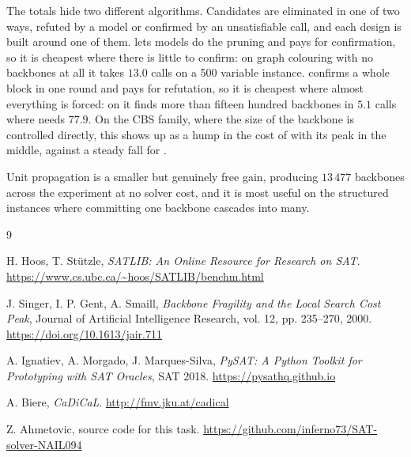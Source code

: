 \documentclass[11pt,a4paper]{article}
\begin{document}
The totals hide two different algorithms.
Candidates are eliminated in one of two ways, refuted by a model or confirmed
by an unsatisfiable call, and each design is built around one of them.
 lets models do the pruning and pays for confirmation, so it
is cheapest where there is little to confirm: on graph colouring with no
backbones at all it takes $13.0$ calls on a 500 variable instance.
 confirms a whole block in one round and pays for refutation,
so it is cheapest where almost everything is forced: on  it
finds more than fifteen hundred backbones in $5.1$ calls where
 needs $77.9$. On the CBS family, where the size of the
backbone is controlled directly, this shows up as a hump in the cost of
 with its peak in the middle, against a steady fall for
.

Unit propagation is a smaller but genuinely free gain, producing $13\,477$
backbones across the experiment at no solver cost, and it is most useful on
the structured instances where committing one backbone cascades into many.

\clearpage

\begin{thebibliography}{9}

H. Hoos, T. St\"utzle, \emph{SATLIB: An Online Resource for Research on SAT}.
\url{https://www.cs.ubc.ca/~hoos/SATLIB/benchm.html}

J. Singer, I. P. Gent, A. Smaill, \emph{Backbone Fragility and the Local
Search Cost Peak}, Journal of Artificial Intelligence Research, vol. 12,
pp. 235--270, 2000.
\url{https://doi.org/10.1613/jair.711}

A. Ignatiev, A. Morgado, J. Marques-Silva,
\emph{PySAT: A Python Toolkit for Prototyping with SAT Oracles}, SAT 2018.
\url{https://pysathq.github.io}

A. Biere, \emph{CaDiCaL}.
\url{http://fmv.jku.at/cadical}

Z. Ahmetovic, source code for this task.
\url{https://github.com/inferno73/SAT-solver-NAIL094}

\end{thebibliography}
\end{document}

